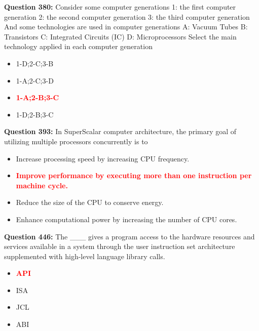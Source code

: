 \documentclass[12pt,a4paper]{article}
\begin{document}
\vspace{0.5cm}

\textbf{Question 380:} Consider some computer generations 1: the first computer generation 2: the second computer generation 3: the third computer generation And some technologies are used in computer generations A: Vacuum Tubes B: Transistors C: Integrated Circuits (IC) D: Microprocessors Select the main technology applied in each computer generation

\begin{itemize}
    \item[\textbf{A.}] 1-D;2-C;3-B
    \item[\textbf{B.}] 1-A;2-C;3-D
    \item[\textbf{C.}] \textcolor{red}{\textbf{1-A;2-B;3-C}}
    \item[\textbf{D.}] 1-D;2-B;3-C
\end{itemize}

\vspace{0.5cm}

\textbf{Question 393:} In SuperScalar computer architecture, the primary goal of utilizing multiple processors concurrently is to

\begin{itemize}
    \item[\textbf{A.}] Increase processing speed by increasing CPU frequency.
    \item[\textbf{B.}] \textcolor{red}{\textbf{Improve performance by executing more than one instruction per machine cycle.}}
    \item[\textbf{C.}] Reduce the size of the CPU to conserve energy.
    \item[\textbf{D.}] Enhance computational power by increasing the number of CPU cores.
\end{itemize}

\vspace{0.5cm}

\textbf{Question 446:} The ___ gives a program access to the hardware resources and services available in a system through the user instruction set architecture supplemented with high-level language library calls.

\begin{itemize}
    \item[\textbf{A.}] \textcolor{red}{\textbf{API}}
    \item[\textbf{B.}] ISA
    \item[\textbf{C.}] JCL
    \item[\textbf{D.}] ABI
\end{itemize}
\end{document}
